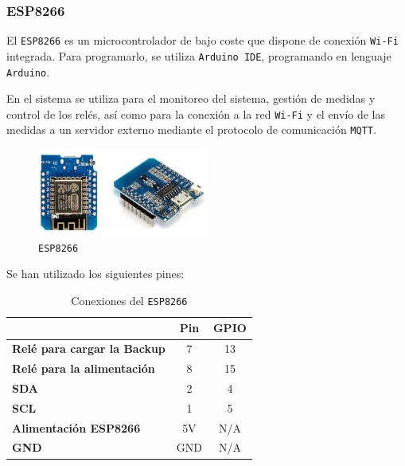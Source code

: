 \subsubsection{ESP8266}

El \texttt{ESP8266} es un microcontrolador de bajo coste que dispone de conexión \texttt{Wi-Fi} integrada. Para programarlo, se utiliza \texttt{Arduino IDE}, programando en lenguaje \texttt{Arduino}. \cite{espressifsystemsESPRESSIFSMARTCONNECTIVITY}

En el sistema se utiliza para el monitoreo del sistema, gestión de medidas y control de los relés, así como para la conexión a la red \texttt{Wi-Fi} y el envío de las medidas a un servidor externo mediante el protocolo de comunicación \texttt{MQTT}.

\begin{figure}[H]
    \centering
    \includegraphics[width=0.5\textwidth]{images/2-hardware/componentes/ESP8266.png}
    \caption{\texttt{ESP8266}}
    \label{fig:hardware/modulos/esp8266}
\end{figure}

Se han utilizado los siguientes pines:

\begin{table}[H]
    \centering
    \begin{tabular}{l|c|c|}
    \cline{2-3}
                                                              & \textbf{Pin} & \textbf{GPIO} \\ \hline
    \multicolumn{1}{|l|}{\textbf{Relé para cargar la Backup}} & 7            & 13            \\ \hline
    \multicolumn{1}{|l|}{\textbf{Relé para la alimentación}}  & 8            & 15            \\ \hline
    \multicolumn{1}{|l|}{\textbf{SDA}}                        & 2            & 4             \\ \hline
    \multicolumn{1}{|l|}{\textbf{SCL}}                        & 1            & 5             \\ \hline
    \multicolumn{1}{|l|}{\textbf{Alimentación ESP8266}}       & 5V           & N/A           \\ \hline
    \multicolumn{1}{|l|}{\textbf{GND}}                        & GND          & N/A           \\ \hline
    \end{tabular}
    \caption{Conexiones del \texttt{ESP8266}}
\end{table}


